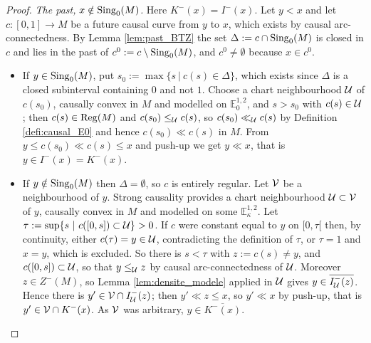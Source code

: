 \documentclass[a4paper,twoside]{article}
\newcommand{\mass}[1]{\mathbb{E}^{1,2}_{#1}}
\begin{document}
\begin{proof}
\emph{The past, $x\notin \mathrm{Sing}_0(M)$.} Here $K^-(x)=I^-(x)$. Let $y< x$ and let $c:[0,1]\rightarrow M$
be a future causal curve from $y$ to $x$, which exists by causal arc-connectedness. By Lemma
\ref{lem:past_BTZ} the set $\Delta:=c\cap \mathrm{Sing}_0(M)$ is closed in $c$ and lies in the past of
$c^0:=c\setminus \mathrm{Sing}_0(M)$, and $c^0\neq\emptyset$ because $x\in c^0$.
\begin{itemize}
\item If $y\in \mathrm{Sing}_0(M)$, put $s_0:=\max\{s~|~c(s)\in \Delta\}$, which exists since $\Delta$ is a
closed subinterval containing $0$ and not $1$. Choose a chart neighbourhood $\mathcal{U}$ of $c(s_0)$,
causally convex in $M$ and modelled on $\mass{0}$, and $s>s_0$ with $c(s)\in \mathcal{U}$; then $c(s)\in
\mathrm{Reg}(M)$ and $c(s_0)\leq_{\mathcal{U}} c(s)$, so $c(s_0)\ll_{\mathcal{U}} c(s)$ by Definition \ref{defi:causal_E0} and
hence $c(s_0)\ll c(s)$ in $M$. From $y\leq c(s_0)\ll c(s)\leq x$ and push-up we get $y\ll x$, that is
$y\in I^-(x)=K^-(x)$.
\item If $y\notin \mathrm{Sing}_0(M)$ then $\Delta=\emptyset$, so $c$ is entirely regular. Let $\mathcal V$ be a
neighbourhood of $y$. Strong causality provides a chart neighbourhood $\mathcal{U}\subset \mathcal V$ of $y$, causally
convex in $M$ and modelled on some $\mass{\kappa}$. Let $\tau:=\sup\{s~|~c([0,s])\subset \mathcal{U}\}>0$. If
$c$ were constant equal to $y$ on $[0,\tau[$ then, by continuity, either $c(\tau)=y\in \mathcal{U}$,
contradicting the definition of $\tau$, or $\tau=1$ and $x=y$, which is excluded. So there is
$s<\tau$ with $z:=c(s)\neq y$, and $c([0,s])\subset \mathcal{U}$, so that $y\leq_{\mathcal{U}} z$ by causal
arc-connectedness of $\mathcal{U}$. Moreover $z\in Z^-(M)$, so Lemma \ref{lem:densite_modele} applied in $\mathcal{U}$
gives $y\in \overline{I^-_{\mathcal{U}}(z)}$. Hence there is $y'\in \mathcal V\cap I^-_{\mathcal{U}}(z)$; then $y'\ll z\leq x$, so
$y'\ll x$ by push-up, that is $y'\in \mathcal V\cap K^-(x)$. As $\mathcal V$ was arbitrary, $y\in \overline{K^-(x)}$.
\end{itemize}


\end{proof}
\end{document}
